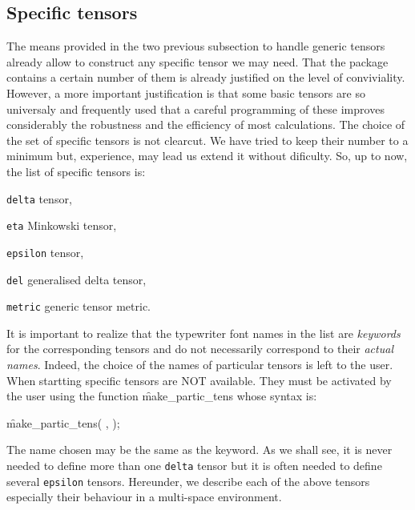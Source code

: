 \subsection{Specific tensors}
The means provided in the two previous subsection to handle generic tensors
already allow to construct any specific tensor we may need.  That the package contains
a certain number of them  is already justified on the level of conviviality.
However, a more important justification is that some basic tensors are so
universaly and frequently used that a careful programming of these improves
considerably the robustness and the efficiency of most calculations.
The choice of the set of specific tensors is not clearcut. We have tried
to keep their number to a minimum but, experience, may lead us extend it
without dificulty. So, up to now, the list of specific tensors is:
\begin{list}{-}{\setlength{\parsep}{0in}\setlength{\itemsep}{1pt}}
\item \texttt{delta} tensor,
\item \texttt{eta} Minkowski tensor,
\item \texttt{epsilon} tensor,
\item \texttt{del} generalised delta tensor,
\item \texttt{metric} generic tensor metric.
\end{list}
It is important to realize that the typewriter font names in the list are
\emph{keywords} for the corresponding tensors and do not necessarily correspond
to their \emph{actual names}.
Indeed, the choice of the names of particular tensors is left to the user.
When startting  specific tensors are NOT
available.
They must be activated by the user using the function
%
\hypertarget{operator:MAKE_PARTIC_TENS}{\f{make\_partic\_tens}} whose syntax is:
\begin{syntax}
      \f{make\_partic\_tens}( , );
\end{syntax}
The name chosen may be the same as the keyword.
As we shall see, it is never needed to define more than one \texttt{delta}
tensor but it is often needed to define several \texttt{epsilon} tensors.
Hereunder, we describe each of the above tensors especially their
behaviour in a multi-space environment.


